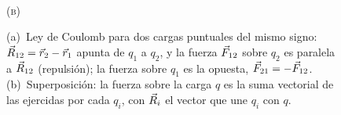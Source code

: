 \begin{figure}[ht]
\begin{minipage}[b]{0.49\textwidth}
\\[2pt]{\small\scshape (b)}
\end{minipage}
\caption{(a)~Ley de Coulomb para dos cargas puntuales del mismo signo:
$\vec{R}_{12}=\vec{r}_2-\vec{r}_1$ apunta de $q_1$ a $q_2$, y la fuerza
$\vec{F}_{12}$ sobre $q_2$ es paralela a $\vec{R}_{12}$ (repulsión); la fuerza sobre $q_1$ es la
opuesta, $\vec{F}_{21}=-\vec{F}_{12}$. (b)~Superposición: la fuerza sobre la carga $q$ es la suma
vectorial de las ejercidas por cada $q_i$, con $\vec{R}_i$ el vector que une $q_i$ con $q$.}
\label{fig:coulomb}
\end{figure}
